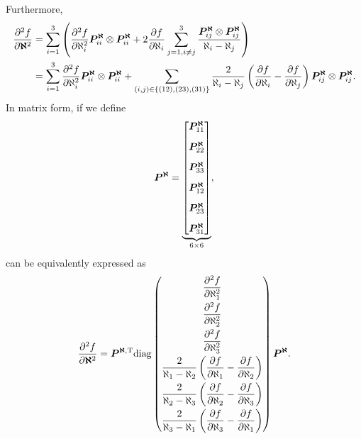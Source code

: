 Furthermore,
\begin{gather}\label{eq:yld0418p_dfdaleph}
    \begin{split}
        \dfrac{\partial{^2f}}{\partial{\bm{\aleph}^2}} & =\sum_{i=1}^{3}\left(\dfrac{\partial{^2f}}{\partial{\aleph_i^2}}\bm{P}_{ii}^{\bm{\aleph}}\otimes\bm{P}_{ii}^{\bm{\aleph}}+2\dfrac{\partial{f}}{\partial{\aleph_i}}\sum_{j=1,i\neq{}j}^3\dfrac{\bm{P}_{ij}^{\bm{\aleph}}\otimes\bm{P}_{ij}^{\bm{\aleph}}}{\aleph_i-\aleph_j}\right)                                   \\
                                    & =\sum_{i=1}^{3}\dfrac{\partial{^2f}}{\partial{\aleph_i^2}}\bm{P}_{ii}^{\bm{\aleph}}\otimes\bm{P}_{ii}^{\bm{\aleph}}+\sum_{(i,j)\in\{(12),(23),(31)\}}\dfrac{2}{\aleph_i-\aleph_j}\left(\dfrac{\partial{f}}{\partial{\aleph_i}}-\dfrac{\partial{f}}{\partial{\aleph_j}}\right)\bm{P}_{ij}^{\bm{\aleph}}\otimes\bm{P}_{ij}^{\bm{\aleph}}.
    \end{split}
\end{gather}
In matrix form, if we define
\begin{gather}
    \bm{P}^{\bm{\aleph}}=\underbrace{\begin{bmatrix}
            \bm{P}_{11}^{\bm{\aleph}} \\[3mm]
            \bm{P}_{22}^{\bm{\aleph}} \\[3mm]
            \bm{P}_{33}^{\bm{\aleph}} \\[3mm]
            \bm{P}_{12}^{\bm{\aleph}} \\[3mm]
            \bm{P}_{23}^{\bm{\aleph}} \\[3mm]
            \bm{P}_{31}^{\bm{\aleph}}
        \end{bmatrix}}_{6\times6},
\end{gather}
 can be equivalently expressed as
\begin{gather}
    \dfrac{\partial{^2f}}{\partial{\bm{\aleph}^2}}= \bm{P}^{\bm{\aleph},\mathrm{T}}\text{diag}\left(\begin{matrix}
            \dfrac{\partial{^2f}}{\partial{\aleph_1^2}}                                                           \\[3mm]
            \dfrac{\partial{^2f}}{\partial{\aleph_2^2}}                                                           \\[3mm]
            \dfrac{\partial{^2f}}{\partial{\aleph_3^2}}                                                           \\[3mm]
            \dfrac{2}{\aleph_1-\aleph_2}\left(\dfrac{\partial{f}}{\partial{\aleph_1}}-\dfrac{\partial{f}}{\partial{\aleph_2}}\right) \\[3mm]
            \dfrac{2}{\aleph_2-\aleph_3}\left(\dfrac{\partial{f}}{\partial{\aleph_2}}-\dfrac{\partial{f}}{\partial{\aleph_3}}\right) \\[3mm]
            \dfrac{2}{\aleph_3-\aleph_1}\left(\dfrac{\partial{f}}{\partial{\aleph_3}}-\dfrac{\partial{f}}{\partial{\aleph_1}}\right)
        \end{matrix}\right)\bm{P}^{\bm{\aleph}}.
\end{gather}

